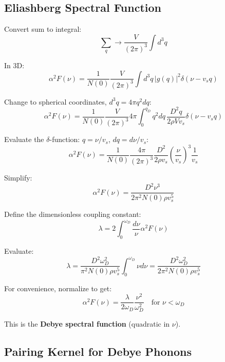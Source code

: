 \documentclass[12pt]{article}
\begin{document}
\subsection{Eliashberg Spectral Function}

Convert sum to integral:
\begin{equation}
\sum_q \to \frac{V}{(2\pi)^3} \int d^3q
\end{equation}

In 3D:
\begin{equation}
\alpha^2F(\nu) = \frac{1}{N(0)} \frac{V}{(2\pi)^3} \int d^3q \, |g(q)|^2 \delta(\nu - v_s q)
\end{equation}

Change to spherical coordinates, $d^3q = 4\pi q^2 dq$:
\begin{equation}
\alpha^2F(\nu) = \frac{1}{N(0)} \frac{V}{(2\pi)^3} 4\pi \int_0^{q_D} q^2 dq \, \frac{D^2 q}{2\rho V v_s} \delta(\nu - v_s q)
\end{equation}

Evaluate the $\delta$-function: $q = \nu/v_s$, $dq = d\nu/v_s$:
\begin{equation}
\alpha^2F(\nu) = \frac{1}{N(0)} \frac{4\pi}{(2\pi)^3} \frac{D^2}{2\rho v_s} \left(\frac{\nu}{v_s}\right)^3 \frac{1}{v_s}
\end{equation}

Simplify:
\begin{equation}
\alpha^2F(\nu) = \frac{D^2 \nu^3}{2\pi^2 N(0) \rho v_s^5}
\end{equation}

Define the dimensionless coupling constant:
\begin{equation}
\lambda = 2\int_0^{\omega_D} \frac{d\nu}{\nu} \alpha^2F(\nu)
\end{equation}

Evaluate:
\begin{equation}
\lambda = \frac{D^2 \omega_D^2}{\pi^2 N(0) \rho v_s^5} \int_0^{\omega_D} \nu d\nu = \frac{D^2 \omega_D^2}{2\pi^2 N(0) \rho v_s^5}
\end{equation}

For convenience, normalize to get:
\begin{equation}
\boxed{
\alpha^2F(\nu) = \frac{\lambda}{2\omega_D} \frac{\nu^2}{\omega_D^2} \quad \text{for } \nu < \omega_D
}
\end{equation}

This is the \textbf{Debye spectral function} (quadratic in $\nu$).

\subsection{Pairing Kernel for Debye Phonons}
\end{document}
